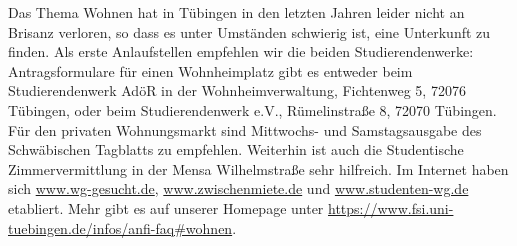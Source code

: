Das Thema Wohnen hat in Tübingen in den letzten Jahren leider nicht an Brisanz verloren, so dass
es unter Umständen schwierig ist, eine Unterkunft zu finden. Als erste Anlaufstellen empfehlen wir
die beiden Studierendenwerke: Antragsformulare für einen Wohnheimplatz gibt es entweder beim
Studierendenwerk AdöR in der Wohnheimverwaltung, Fichtenweg 5, 72076 Tübingen, oder beim Studierendenwerk
e.V., Rümelinstraße 8, 72070 Tübingen. Für den privaten Wohnungsmarkt sind Mittwochs- und Samstagsausgabe
des Schwäbischen Tagblatts zu empfehlen. Weiterhin ist auch die Studentische Zimmervermittlung in der Mensa
Wilhelmstraße sehr hilfreich. Im Internet haben sich \url{www.wg-gesucht.de}, \url{www.zwischenmiete.de} und
\url{www.studenten-wg.de} etabliert. Mehr gibt es auf
unserer Homepage unter \url{https://www.fsi.uni-tuebingen.de/infos/anfi-faq\#wohnen}.
\fi
